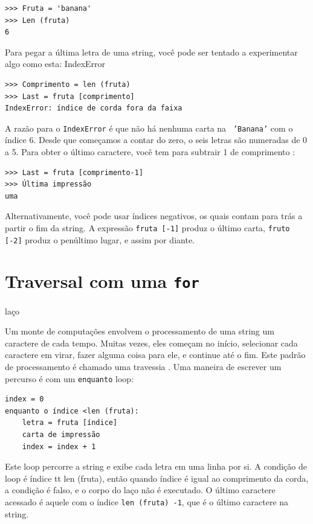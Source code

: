 \documentclass[10pt]{book}
\begin{document}
\begin{exercise}
{\begin{verbatim}
>>> Fruta = 'banana'
>>> Len (fruta)
6
\end{verbatim}
%
Para pegar a última letra de uma string, você pode ser tentado a experimentar algo
como esta:
\index{} IndexError

\begin{verbatim}
>>> Comprimento = len (fruta)
>>> Last = fruta [comprimento]
IndexError: índice de corda fora da faixa
\end{verbatim}
%
A razão para o {\tt IndexError} é que não há nenhuma carta na {\tt
'Banana'} com o índice 6. Desde que começamos a contar do zero, o
seis letras são numeradas de 0 a 5. Para obter o último caractere, você tem
para subtrair 1 de comprimento {\tt}:

\begin{verbatim}
>>> Last = fruta [comprimento-1]
>>> Última impressão
uma
\end{verbatim}
%
Alternativamente, você pode usar índices negativos, os quais contam para trás a partir
o fim da string. A expressão {\tt fruta [-1]} produz o último
carta, {\tt fruto [-2]} produz o penúltimo lugar, e assim por diante.


\section{Traversal com uma {\tt for}} laço
\label{for}

Um monte de computações envolvem o processamento de uma string um caractere de cada
tempo. Muitas vezes, eles começam no início, selecionar cada caractere em
virar, fazer alguma coisa para ele, e continue até o fim. Este padrão de
processamento é chamado uma travessia {\bf}. Uma maneira de escrever um percurso
é com um {\tt enquanto} loop:

\begin{verbatim}
index = 0
enquanto o índice <len (fruta):
    letra = fruta [índice]
    carta de impressão
    index = index + 1
\end{verbatim}
%
Este loop percorre a string e exibe cada letra em uma linha por
si. A condição de loop é {índice tt \<len (fruta)}, então
quando {índice \tt} é igual ao comprimento da corda, a
condição é falso, e o corpo do laço não é executado. O
último caractere acessado é aquele com o índice {\tt len ​​(fruta) -1},
que é o último caractere na string.

}
\end{exercise}
\end{document}
